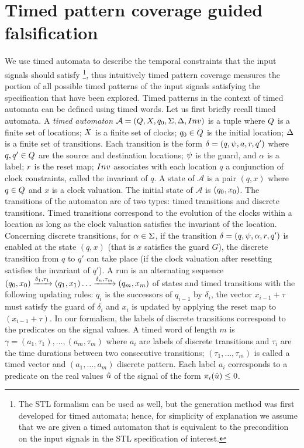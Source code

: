 \section{Timed pattern coverage guided falsification} \label{sec:specCov}
We use timed automata  to describe the temporal constraints that the input signals should satisfy \footnote{The STL formalism can be used as well, but the generation method was first developed for timed automata; hence, for simplicity of explanation we assume that we are given a timed automaton that is equivalent to the precondition on the input signals in the STL specification of interest.}, thus intuitively timed pattern coverage measures the portion of all possible timed patterns of the input signals satisfying the specification that have been explored. Timed patterns in the context of timed automata can be defined using timed words. Let us first briefly recall timed automata. A \emph{timed automaton} $\mathcal{A} = (Q, X, q_{0}, \Sigma, \Delta, Inv)$ is a tuple where $Q$ is a finite set of locations; $X$ is a finite set of clocks; $q_{0} \in Q$ is the initial location; $\Delta$ is a finite set of transitions. Each transition is the form $\delta = (q,\psi,a, r,q')$ where $q, q' \in Q$ are the source and destination locations; $\psi$ is the guard, and $\alpha$ is a label; $r$ is the reset map; $Inv$ associates with each location $q$ a conjunction of clock constraints, called the invariant of $q$. A state of $\mathcal{A}$ is a pair $(q,x)$ where $q \in Q$ and $x$ is a clock valuation. The initial state of $\mathcal{A}$ is $(q_{0}, x_0)$. The transitions of the automaton are of two types: timed transitions and discrete transitions. Timed transitions correspond to the evolution of the clocks within a location as long as the clock valuation satisfies the invariant of the location. Concerning discrete transitions, for $\alpha \in \Sigma$, if the transition $\delta = (q,\psi,\alpha,r,q')$ is enabled at the state $(q, x)$ (that is $x$ satisfies the guard $G$), the discrete transition from $q$ to $q'$ can take place (if the clock valuation after resetting satisfies the invariant of $q'$). A run is an alternating sequence $(q_{0},x_0)\xrightarrow{\delta_1,\tau_1}(q_1,x_1)\ldots \xrightarrow{\delta_n,\tau_m}(q_m,x_m)$ of states and timed transitions with the following updating rules: $q_{i}$ is the successors of $q_{i-1}$ by $\delta_i$, the vector $x_{i-1}+\tau$ must satisfy the guard of $\delta_i$ and $x_i$ is updated by applying the reset map to $(x_{i-1}+\tau)$. In our formalism, the labels of discrete transitions correspond to the predicates on the signal values. A timed word of length $m$ is $\gamma = (a_1, \tau_1), \ldots, (a_m, \tau_m)$ where $a_i$ are labels of discrete transitions and $\tau_i$ are the time durations between two consecutive transitions; $(\tau_1, \ldots, \tau_m)$ is called a timed vector and $(a_1, \ldots, a_m)$ discrete pattern. Each label $a_i$ corresponds to a predicate on the real values $\hat{u}$ of the signal of the form $\pi_i(\hat{u}) \le 0$. 

